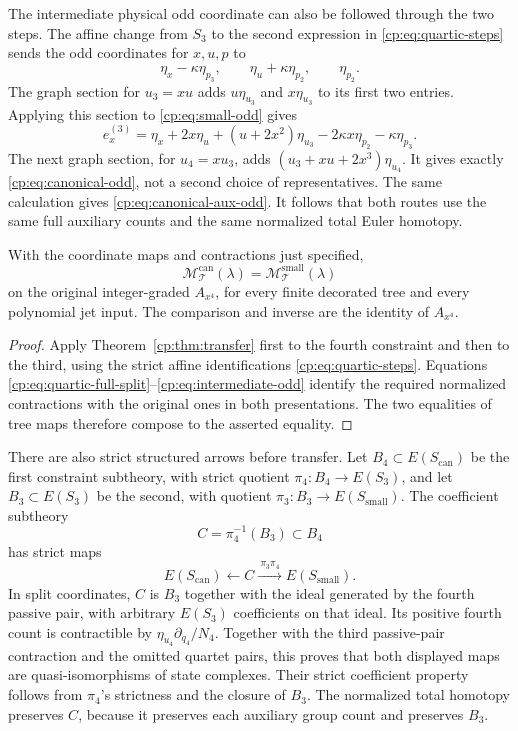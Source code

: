 The intermediate physical odd coordinate can also be followed through
the two steps.  The affine change from \(S_3\) to the second
expression in \eqref{cp:eq:quartic-steps} sends the odd coordinates
for \(x,u,p\) to
\[
 \eta_x-\kappa\eta_{p_3},\qquad
 \eta_u+\kappa\eta_{p_2},\qquad \eta_{p_2}.
\]
The graph section for \(u_3=xu\) adds
\(u\eta_{u_3}\) and \(x\eta_{u_3}\) to its first two entries.
Applying this section to \eqref{cp:eq:small-odd} gives
\begin{equation}\label{cp:eq:intermediate-odd}
 e_x^{(3)}=
 \eta_x+2x\eta_u+(u+2x^2)\eta_{u_3}
               -2\kappa x\eta_{p_2}-\kappa\eta_{p_3}.
\end{equation}
The next graph section, for \(u_4=xu_3\), adds
\((u_3+xu+2x^3)\eta_{u_4}\).  It gives exactly
\eqref{cp:eq:canonical-odd}, not a second choice of representatives.
The same calculation gives \eqref{cp:eq:canonical-aux-odd}.
It follows that both routes use the same full auxiliary counts
and the same normalized total Euler homotopy.

\begin{corollary}
\label{cp:cor:quartic}
With the coordinate maps and contractions just specified,
\[
 \mathcal M_{\mathcal T}^{\mathrm{can}}(\lambda)
       =\mathcal M_{\mathcal T}^{\mathrm{small}}(\lambda)
\]
on the original integer-graded \(A_{x^4}\), for every finite
decorated tree and every polynomial jet input.  The comparison and
inverse are the identity of \(A_{x^4}\).
\end{corollary}

\begin{proof}
Apply Theorem~\ref{cp:thm:transfer} first to the fourth constraint
and then to the third, using the strict affine identifications
\eqref{cp:eq:quartic-steps}.  Equations
\eqref{cp:eq:quartic-full-split}--\eqref{cp:eq:intermediate-odd}
identify the required normalized contractions with the original
ones in both presentations.  The two equalities of tree maps
therefore compose to the asserted equality.
\end{proof}

There are also strict structured arrows before transfer.
Let \(B_4\subset E(S_{\mathrm{can}})\) be the first constraint
subtheory, with strict quotient \(\pi_4:B_4\to E(S_3)\), and
let \(B_3\subset E(S_3)\) be the second, with quotient
\(\pi_3:B_3\to E(S_{\mathrm{small}})\).
The coefficient subtheory
\[
 C=\pi_4^{-1}(B_3)\subset B_4
\]
has strict maps
\[
 E(S_{\mathrm{can}})\longleftarrow C
                       \xrightarrow{\ \pi_3\pi_4\ }
                         E(S_{\mathrm{small}}).
\]
In split coordinates, \(C\) is \(B_3\) together with the ideal
generated by the fourth passive pair, with arbitrary \(E(S_3)\)
coefficients on that ideal.  Its positive fourth count is
contractible by \(\eta_{u_4}\partial_{q_4}/N_4\).
Together with the third passive-pair contraction and the omitted
quartet pairs, this proves that both displayed maps are
quasi-isomorphisms of state complexes.  Their strict coefficient
property follows from \(\pi_4\)'s strictness and the closure of
\(B_3\).  The normalized total homotopy preserves \(C\), because
it preserves each auxiliary group count and preserves \(B_3\).


